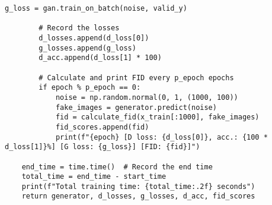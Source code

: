 \begin{lstlisting}[style=mypython, caption=GAN Model with Dense Layers]
        g_loss = gan.train_on_batch(noise, valid_y)

        # Record the losses
        d_losses.append(d_loss[0])
        g_losses.append(g_loss)
        d_acc.append(d_loss[1] * 100)
        
        # Calculate and print FID every p_epoch epochs
        if epoch % p_epoch == 0:
            noise = np.random.normal(0, 1, (1000, 100))
            fake_images = generator.predict(noise)
            fid = calculate_fid(x_train[:1000], fake_images)
            fid_scores.append(fid)
            print(f"{epoch} [D loss: {d_loss[0]}, acc.: {100 * d_loss[1]}%] [G loss: {g_loss}] [FID: {fid}]")

    end_time = time.time()  # Record the end time
    total_time = end_time - start_time
    print(f"Total training time: {total_time:.2f} seconds")
    return generator, d_losses, g_losses, d_acc, fid_scores
\end{lstlisting}




